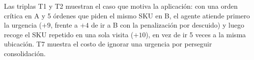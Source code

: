 \documentclass[11pt,letterpaper]{article}
\begin{document}
Las triplas T1 y T2 muestran el caso que motiva la aplicación: con una orden crítica en A y 5 órdenes
que piden el mismo SKU en B, el agente atiende primero la urgencia ($+9$, frente a $+4$ de ir a B con
la penalización por descuido) y luego recoge el SKU repetido en una sola visita ($+10$), en vez de
ir 5 veces a la misma ubicación. T7 muestra el costo de ignorar una urgencia por perseguir consolidación.
\end{document}

